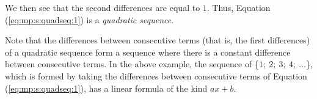 We then see that the second differences are equal to $1$. Thus, Equation (\ref{eq:mp:s:quadseq:1}) is a \textit{quadratic sequence}. 

Note that the differences between consecutive terms (that is, the first differences) of a quadratic sequence form a sequence where there is a constant difference between consecutive terms. In the above example, the sequence of \{$1; \: 2; \: 3; \: 4; \: \ldots $\}, which is formed by taking the differences between consecutive terms of Equation (\ref{eq:mp:s:quadseq:1}), has a linear formula of the kind $ax+b$. 



